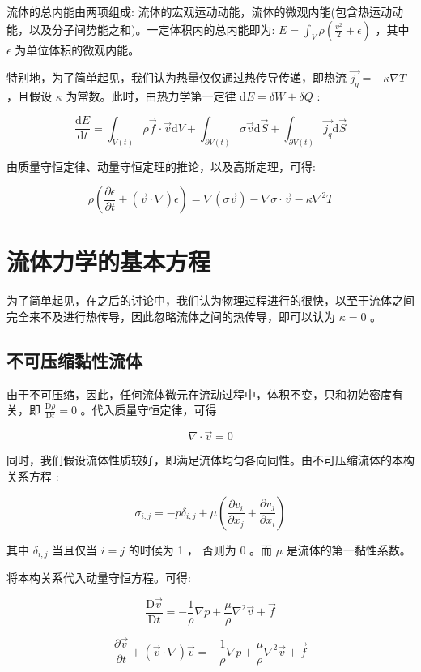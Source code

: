 \documentclass[fontset=windows]{article}
\newcommand{\upcite}[1]{\textsuperscript{\cite{#1}}}
\begin{document}
流体的总内能由两项组成: 流体的宏观运动动能，流体的微观内能(包含热运动动能，以及分子间势能之和)。一定体积内的总内能即为: $E = \int_V \rho(\frac{v ^ 2}{2} + \epsilon)$ ，其中 $\epsilon$ 为单位体积的微观内能。

特别地，为了简单起见，我们认为热量仅仅通过热传导传递，即热流 $ \vec{j_q} = -\kappa \nabla T$ ，且假设 $\kappa$ 为常数。此时，由热力学第一定律 $\mathrm{d}E = \delta W +  \delta Q$ :

$$
\frac{\mathrm{d}E}{\mathrm{d}t}
= \int_{V(t)} \rho \vec {f} \cdot \vec{v} \mathrm{d}V + \int_{\partial V(t)} \sigma \vec{v} \mathrm{d}\vec{S} + \int_{\partial V(t)} \vec{j_q} \mathrm{d}\vec{S} 
$$

由质量守恒定律、动量守恒定理的推论，以及高斯定理，可得:

$$
\rho(\frac{\partial \epsilon}{\partial t} + (\vec{v} \cdot \nabla) \epsilon) = \nabla (\sigma \vec {v}) - \nabla{\sigma} \cdot \vec{v} - \kappa \nabla^2{T}
$$

\section{流体力学的基本方程}

为了简单起见，在之后的讨论中，我们认为物理过程进行的很快，以至于流体之间完全来不及进行热传导，因此忽略流体之间的热传导，即可以认为 $\kappa = 0$ 。

\subsection{不可压缩黏性流体}

由于不可压缩，因此，任何流体微元在流动过程中，体积不变，只和初始密度有关，即 $\frac{\mathrm{D}\rho}{\mathrm{D}t} = 0$ 。代入质量守恒定律，可得 

$$
\nabla \cdot \vec{v} = 0
$$

同时，我们假设流体性质较好，即满足流体均匀各向同性。由不可压缩流体的本构关系方程 \upcite{ref3} :

$$
\sigma_{i,j} = -p\delta_{i,j} + \mu(\frac{\partial v_i}{\partial x_j} + \frac{\partial v_j}{\partial x_i})
$$

其中 $\delta_{i,j}$ 当且仅当 $i = j$ 的时候为 1 ， 否则为 0 。而 $\mu$ 是流体的第一黏性系数。

将本构关系代入动量守恒方程。可得:

$$ 
\frac{\mathrm{D}\vec{v}}{\mathrm{D}t} = -\frac{1}{\rho}\nabla{p} + \frac{\mu}{\rho}\nabla^2{\vec{v}} + \vec{f}
$$

$$ 
\frac{\partial \vec{v}}{\partial t} + (\vec{v} \cdot \nabla) \vec{v}  = -\frac{1}{\rho}\nabla{p} + \frac{\mu}{\rho}\nabla^2{\vec{v}} + \vec{f}
$$
\end{document}
